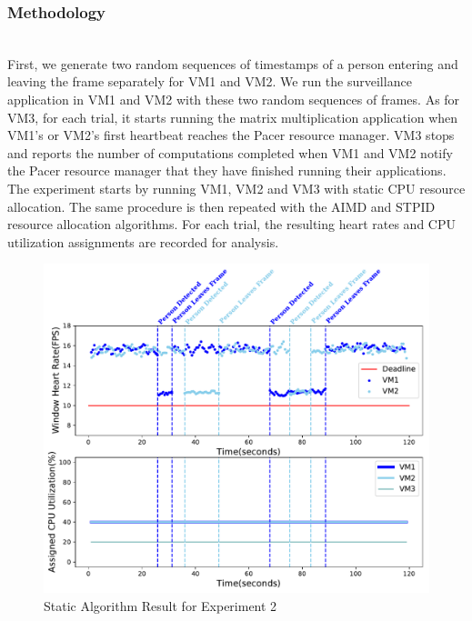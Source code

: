 \subsubsection*{Methodology}\hfill\\
\indent First, we generate two random sequences of timestamps of a person entering and leaving the frame separately for VM1 and VM2. We run the surveillance application in VM1 and VM2 with these two random sequences of frames. As for VM3, for each trial, it starts running the matrix multiplication application when VM1's or VM2's first heartbeat reaches the Pacer resource manager. VM3 stops and reports the number of computations completed when VM1 and VM2 notify the Pacer resource manager that they have finished running their applications. The experiment starts by running VM1, VM2 and VM3 with static CPU resource allocation. The same procedure is then repeated with the AIMD and STPID resource allocation algorithms. For each trial, the resulting heart rates and CPU utilization assignments are recorded for analysis.




\begin{figure}[h!]
\centering
\includegraphics[width=1\linewidth]{images/3vm_static}
\caption{Static Algorithm Result for Experiment 2}
\label{3vm_static}
\end{figure}

